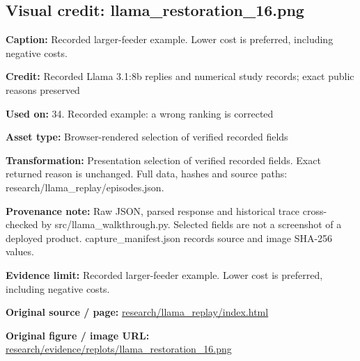 \documentclass[10pt,letterpaper]{article}
\begin{document}
\subsection*{Visual credit: llama\_restoration\_16.png}
\textbf{Caption:} Recorded larger-feeder example. Lower cost is preferred, including negative costs.\par
\textbf{Credit:} Recorded Llama 3.1:8b replies and numerical study records; exact public reasons preserved\par
\textbf{Used on:} 34. Recorded example: a wrong ranking is corrected\par
\textbf{Asset type:} Browser-rendered selection of verified recorded fields\par
\textbf{Transformation:} Presentation selection of verified recorded fields. Exact returned reason is unchanged. Full data, hashes and source paths: research/llama\_replay/episodes.json.\par
\textbf{Provenance note:} Raw JSON, parsed response and historical trace cross-checked by src/llama\_walkthrough.py. Selected fields are not a screenshot of a deployed product. capture\_manifest.json records source and image SHA-256 values.\par
\textbf{Evidence limit:} Recorded larger-feeder example. Lower cost is preferred, including negative costs.\par
\textbf{Original source / page:} \href{../research/llama_replay/index.html}{\small\ttfamily research/\allowbreak{}llama\_\allowbreak{}replay/\allowbreak{}index.\allowbreak{}html}\par
\textbf{Original figure / image URL:} \href{../research/evidence/replots/llama_restoration_16.png}{\small\ttfamily research/\allowbreak{}evidence/\allowbreak{}replots/\allowbreak{}llama\_\allowbreak{}restoration\_\allowbreak{}16.\allowbreak{}png}\par
\par\medskip
\end{document}

